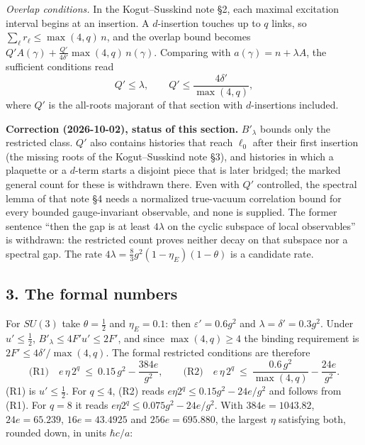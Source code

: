 \documentclass[11pt,a4paper]{article}
\begin{document}
\emph{Overlap conditions.} In the Kogut--Susskind note §2, each maximal
excitation interval begins at an insertion. A \(d\)-insertion touches up
to \(q\) links, so \(\sum_\ell r_\ell\le\max(4,q)\,n\), and the overlap
bound becomes \(Q'A(\gamma)+\frac{Q'}{4\delta'}\max(4,q)\,n(\gamma)\).
Comparing with \(a(\gamma)=n+\lambda A\), the sufficient conditions read
\[Q'\le\lambda,\qquad Q'\le\frac{4\delta'}{\max(4,q)},\] where \(Q'\) is
the all-roots majorant of that section with \(d\)-insertions included.

\textbf{Correction (2026-10-02), status of this section.} \(B'_\lambda\)
bounds only the restricted class. \(Q'\) also contains histories that
reach \(\ell_0\) after their first insertion (the missing roots of the
Kogut--Susskind note §3), and histories in which a plaquette or a
\(d\)-term starts a disjoint piece that is later bridged; the marked
general count for these is withdrawn there. Even with \(Q'\) controlled,
the spectral lemma of that note §4 needs a normalized true-vacuum
correlation bound for every bounded gauge-invariant observable, and none
is supplied. The former sentence ``then the gap is at least \(4\lambda\)
on the cyclic subspace of local observables'' is withdrawn: the
restricted count proves neither decay on that subspace nor a spectral
gap. The rate \(4\lambda=\frac83g^2(1-\eta_E)(1-\theta)\) is a candidate
rate.

\hypertarget{the-formal-numbers}{%
\subsection{3. The formal numbers}\label{the-formal-numbers}}

For \(SU(3)\) take \(\theta=\frac12\) and \(\eta_E=0.1\): then
\(\varepsilon'=0.6g^2\) and \(\lambda=\delta'=0.3g^2\). Under
\(u'\le\frac12\), \(B'_\lambda\le4F'u'\le2F'\), and since
\(\max(4,q)\ge4\) the binding requirement is
\(2F'\le4\delta'/\max(4,q)\). The formal restricted conditions are
therefore
\[\text{(R1)}\quad e\,\eta\,2^q\ \le\ 0.15\,g^2-\frac{384e}{g^2},\qquad
\text{(R2)}\quad e\,\eta\,2^q\ \le\ \frac{0.6\,g^2}{\max(4,q)}-\frac{24e}{g^2}.\]
(R1) is \(u'\le\frac12\). For \(q\le4\), (R2) reads
\(e\eta2^q\le0.15g^2-24e/g^2\) and follows from (R1). For \(q=8\) it
reads \(e\eta2^q\le0.075g^2-24e/g^2\). With \(384e=1043.82\),
\(24e=65.239\), \(16e=43.4925\) and \(256e=695.880\), the largest
\(\eta\) satisfying both, rounded down, in units \(\hbar c/a\):
\end{document}
